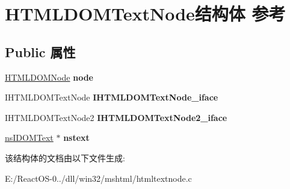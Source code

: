 \hypertarget{struct_h_t_m_l_d_o_m_text_node}{}\section{H\+T\+M\+L\+D\+O\+M\+Text\+Node结构体 参考}
\label{struct_h_t_m_l_d_o_m_text_node}
\subsection*{Public 属性}
\begin{DoxyCompactItemize}
\item 
\mbox{\label{struct_h_t_m_l_d_o_m_text_node_af4ec9560cc6f6d9f0c7ab85b82ef9feb}} 
\hyperlink{struct_h_t_m_l_d_o_m_node}{H\+T\+M\+L\+D\+O\+M\+Node} {\bfseries node}
\item 
\mbox{\label{struct_h_t_m_l_d_o_m_text_node_a63adb5174f1b4854ffed7f8934ccd128}} 
I\+H\+T\+M\+L\+D\+O\+M\+Text\+Node {\bfseries I\+H\+T\+M\+L\+D\+O\+M\+Text\+Node\+\_\+iface}
\item 
\mbox{\label{struct_h_t_m_l_d_o_m_text_node_a09b2c067909b9993e59cc69aeeb749d3}} 
I\+H\+T\+M\+L\+D\+O\+M\+Text\+Node2 {\bfseries I\+H\+T\+M\+L\+D\+O\+M\+Text\+Node2\+\_\+iface}
\item 
\mbox{\label{struct_h_t_m_l_d_o_m_text_node_a383ff758e8911cbbdfc2b335866c5c5c}} 
\hyperlink{interfacens_i_d_o_m_text}{ns\+I\+D\+O\+M\+Text} $\ast$ {\bfseries nstext}
\end{DoxyCompactItemize}


该结构体的文档由以下文件生成\+:\begin{DoxyCompactItemize}
\item 
E\+:/\+React\+O\+S-\/0../dll/win32/mshtml/htmltextnode.\+c\end{DoxyCompactItemize}

